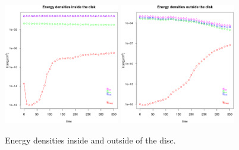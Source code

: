 \documentclass[a4paper,12pt]{article}
\begin{document}
\begin{figure}[!ht]
 \begin{center}
  \includegraphics[width=0.45\textwidth]{figs/energies_vs_t_disco.eps}
  \includegraphics[width=0.45\textwidth]{figs/energies_vs_t_outside.eps}
  \caption{Energy densities inside and outside of the disc.}
 \label{energies}
 \end{center}
\end{figure}
\end{document}
